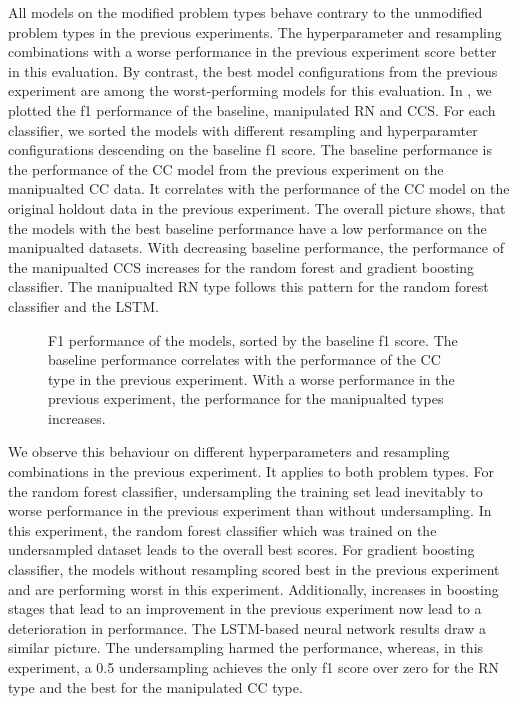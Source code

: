 All models on the modified problem types behave contrary to the unmodified problem types in the previous experiments. The hyperparameter and resampling combinations with a worse performance in the previous experiment score better in this evaluation. By contrast, the best model configurations from the previous experiment are among the worst-performing models for this evaluation. In , we plotted the f1 performance of the baseline, manipulated RN and CCS. For each classifier, we sorted the models with different resampling and hyperparamter configurations descending on the baseline f1 score. The baseline performance is the performance of the CC model from the previous experiment on the manipualted CC data. It correlates with the performance of the CC model on the original holdout data in the previous experiment. The overall picture shows, that the models with the best baseline performance have a low performance on the manipualted datasets. With decreasing baseline performance, the performance of the manipualted CCS increases for the random forest and gradient boosting classifier. The manipualted RN type follows this pattern for the random forest classifier and the LSTM. 


\begin{figure}[h]
    \begin{center}
        
    \end{center}
    \caption[F1 performance of the models, sorted by the baseline f1 score.]{F1 performance of the models, sorted by the baseline f1 score. The baseline performance correlates with the performance of the CC type in the previous experiment. With a worse performance in the previous experiment, the performance for the manipualted types increases.}
    \label{fig:rq3_performance_comparison}
\end{figure}

We observe this behaviour on different hyperparameters and resampling combinations in the previous experiment. It applies to both problem types.
For the random forest classifier, undersampling the training set lead inevitably to worse performance in the previous experiment than without undersampling. In this experiment, the random forest classifier which was trained on the undersampled dataset leads to the overall best scores. For gradient boosting classifier, the models without resampling scored best in the previous experiment and are performing worst in this experiment. Additionally, increases in boosting stages that lead to an improvement in the previous experiment now lead to a deterioration in performance. 
The LSTM-based neural network results draw a similar picture. The undersampling harmed the performance, whereas, in this experiment, a 0.5 undersampling achieves the only f1 score over zero for the RN type and the best for the manipulated CC type.

